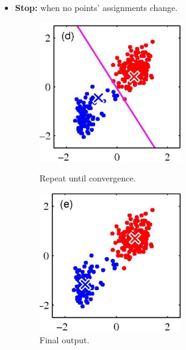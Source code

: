 \begin{itemize}
\begin{enumerate}
\begin{figure}[H]
\begin{minipage}[t]{0.42\linewidth}
			\end{minipage}
		\end{figure}
		\FloatBarrier
	\end{enumerate}
	\item \textbf{Stop:} when no points' assignments change.
	\begin{figure}[H]
		\begin{minipage}[t]{0.42\linewidth} 
			\centering
			\includegraphics[width=0.58\textwidth]{img/kmeans4}
			\caption{Repeat until convergence.}
		\end{minipage}        
		\hspace{2.5cm}
		\begin{minipage}[t]{0.42\linewidth} 
			\centering
			\includegraphics[width=0.58\textwidth]{img/kmeans5}
			\caption{Final output.}
		\end{minipage}
	\end{figure}
\end{itemize}
